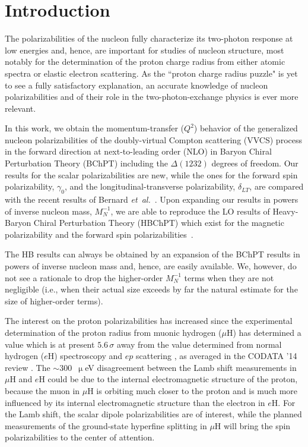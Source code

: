 \documentclass[twocolumn,prc,showpacs,nofootinbib,preprintnumbers,amsmath,amssymb,superscriptaddress]{revtex4-1}
\begin{document}
\tableofcontents

\section{Introduction}

The polarizabilities of the nucleon fully characterize its two-photon response
at low energies and, hence, are important for studies of nucleon structure,
most notably for the determination of the proton charge radius from
either atomic spectra or elastic electron scattering. As the ``proton
charge radius puzzle" \cite{Pohl:2010zza,Antognini:1900ns,Pohl:2013yb,Hagelstein:2015egb} is yet to 
see a fully satisfactory explanation, 
an accurate knowledge of nucleon polarizabilities and of their role
in the two-photon-exchange physics is ever more relevant. 

In this work, we obtain the momentum-transfer ($Q^2$) behavior of the
generalized nucleon polarizabilities of the doubly-virtual Compton scattering (VVCS)
process in the forward direction at next-to-leading order (NLO) in Baryon
Chiral Perturbation Theory (BChPT) including the $\Delta(1232)$ degrees of freedom.  Our results for the scalar
polarizabilities are new, while the ones for the forward spin polarizability, $\gamma_0$, and the longitudinal-transverse polarizability, $\delta_{LT}$,
are compared with the recent results of
Bernard {\it et~al.}~\cite{Bernard:2012hb}. 
Upon expanding our results in powers of inverse nucleon mass, $M_N^{-1}$, we are able to reproduce the LO results
of Heavy-Baryon Chiral Perturbation Theory (HBChPT) 
which exist for the magnetic polarizability \cite{Birse:2012eb} 
and the forward spin polarizabilities~\cite{Kao:2002cp}.


The HB results can always be obtained by an expansion
of the BChPT results in powers of inverse nucleon mass and, hence, are easily available. We, however, do not see a rationale to drop the higher-order $M_N^{-1}$ terms when they are not 
negligible (i.e., when their actual size exceeds by far the natural estimate
for the size of higher-order terms).

The interest on the proton polarizabilities has increased since the experimental determination of the proton radius from muonic hydrogen ($\mu$H) \cite{Pohl:2010zza,Antognini:1900ns} has determined a value which is at present $5.6\,\sigma$ away from the value determined from normal hydrogen ($e$H) spectroscopy and $ep$ scattering \cite{Bernauer:2010wm}, as averaged in the CODATA '14 review \cite{Mohr:2015ccw}. The $\sim 300$~$\upmu$eV disagreement between the Lamb shift measurements in $\mu$H and $e$H could be due to the internal electromagnetic structure of the proton, because the muon in $\mu$H is orbiting much closer to the proton and is much more influenced by its internal electromagnetic structure than the electron in $e$H. For the Lamb shift, the scalar dipole polarizabilities are of interest, while the planned measurements of the ground-state hyperfine splitting in $\mu$H \cite{Pohl:2016xsr} will bring the spin polarizabilities to the center of attention.
\end{document}
